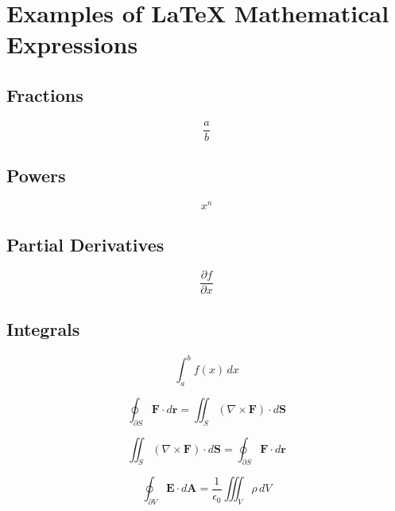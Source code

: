 \documentclass{article}
\begin{document}
\section*{Examples of LaTeX Mathematical Expressions}

\subsection*{Fractions}
\[
\frac{a}{b}
\]

\subsection*{Powers}
\[
x^n
\]

\subsection*{Partial Derivatives}
\[
\frac{\partial f}{\partial x}
\]

\subsection*{Integrals}
\[
\int_{a}^{b} f(x) \, dx
\]

\[
\oint_{\partial S} \mathbf{F} \cdot d\mathbf{r} = \iint_{S} (\nabla \times \mathbf{F}) \cdot d\mathbf{S}
\]

\[
\iint_{S} (\nabla \times \mathbf{F}) \cdot d\mathbf{S} = \oint_{\partial S} \mathbf{F} \cdot d\mathbf{r}
\]

\[
\oint_{\partial V} \mathbf{E} \cdot d\mathbf{A} = \frac{1}{\epsilon_0} \iiint_{V} \rho \, dV
\]
\end{document}
